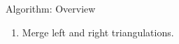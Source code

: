 \documentclass[aspectratio=169,fleqn]{beamer}
\begin{document}
\begin{frame}{Algorithm: Overview}
\begin{mybox}
\begin{enumerate}
          \item<+-> Merge left and right triangulations.
        \end{enumerate}
      \end{mybox}%
  \end{frame}
\end{document}
